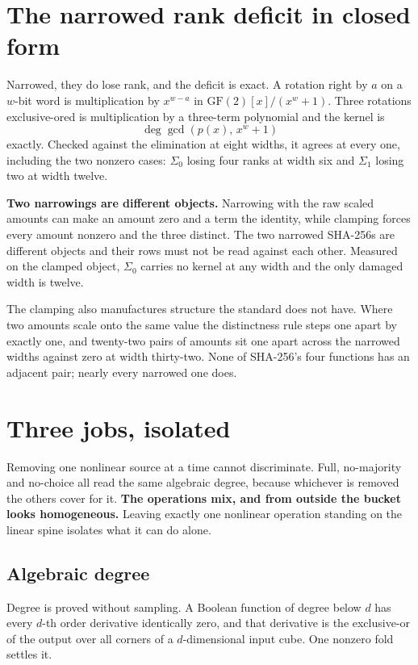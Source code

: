 \section{The narrowed rank deficit in closed form}

Narrowed, they do lose rank, and the deficit is exact. A rotation right by \(a\) on a \(w\)-bit word is multiplication by \(x^{w-a}\) in \(\mathrm{GF}(2)[x]/(x^w + 1)\). Three rotations exclusive-ored is multiplication by a three-term polynomial and the kernel is
\[
  \deg \gcd\!\left(p(x),\, x^w + 1\right)
\]
exactly. Checked against the elimination at eight widths, it agrees at every one, including the two nonzero cases: \(\Sigma_0\) losing four ranks at width six and \(\Sigma_1\) losing two at width twelve.

\textbf{Two narrowings are different objects.} Narrowing with the raw scaled amounts can make an amount zero and a term the identity, while clamping forces every amount nonzero and the three distinct. The two narrowed SHA-256s are different objects and their rows must not be read against each other. Measured on the clamped object, \(\Sigma_0\) carries no kernel at any width and the only damaged width is twelve.

The clamping also manufactures structure the standard does not have. Where two amounts scale onto the same value the distinctness rule steps one apart by exactly one, and twenty-two pairs of amounts sit one apart across the narrowed widths against zero at width thirty-two. None of SHA-256's four functions has an adjacent pair; nearly every narrowed one does.

\section{Three jobs, isolated}

Removing one nonlinear source at a time cannot discriminate. Full, no-majority and no-choice all read the same algebraic degree, because whichever is removed the others cover for it. \textbf{The operations mix, and from outside the bucket looks homogeneous.} Leaving exactly one nonlinear operation standing on the linear spine isolates what it can do alone.

\subsection{Algebraic degree}

Degree is proved without sampling. A Boolean function of degree below \(d\) has every \(d\)-th order derivative identically zero, and that derivative is the exclusive-or of the output over all corners of a \(d\)-dimensional input cube. One nonzero fold settles it.

